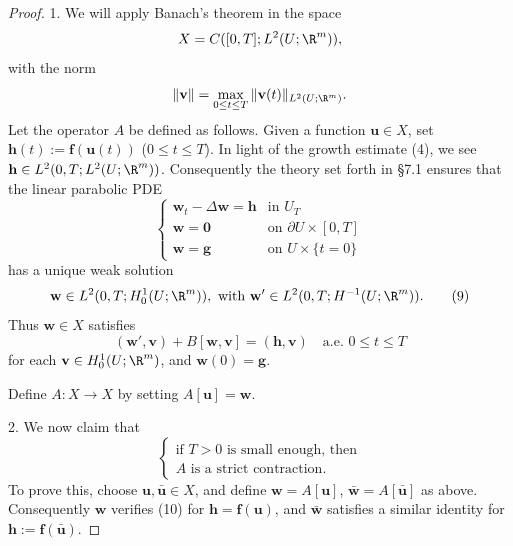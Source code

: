 \begin{proof}
1. We will apply Banach's theorem in the space
\[
X = C([0,T]; L^2(U;\R^m)),
\]
with the norm
\[
\|\mathbf{v}\| = \max_{0 \le t \le T} \|\mathbf{v}(t)\|_{L^2(U;\R^m)}.
\]
Let the operator $A$ be defined as follows. Given a function $\mathbf{u} \in X$, set $\mathbf{h}(t) := \mathbf{f}(\mathbf{u}(t))$ ($0 \le t \le T$). In light of the growth estimate (4), we see $\mathbf{h} \in L^2(0,T;L^2(U;\R^m))$. Consequently the theory set forth in \S7.1 ensures that the linear parabolic PDE
\[
\begin{cases}
\mathbf{w}_t - \Delta \mathbf{w} = \mathbf{h} & \text{in } U_T \\
\mathbf{w} = \mathbf{0} & \text{on } \partial U \times [0,T] \\
\mathbf{w} = \mathbf{g} & \text{on } U \times \{t=0\}
\end{cases}
\tag{8}
\]
has a unique weak solution
\[
\mathbf{w} \in L^2(0,T; H_0^1(U;\R^m)), \text{ with } \mathbf{w}' \in L^2(0,T; H^{-1}(U;\R^m)).
\tag{9}
\]
Thus $\mathbf{w} \in X$ satisfies
\[
(\mathbf{w}',\mathbf{v}) + B[\mathbf{w},\mathbf{v}] = (\mathbf{h},\mathbf{v}) \quad \text{a.e. } 0 \le t \le T
\tag{10}
\]
for each $\mathbf{v} \in H_0^1(U;\R^m)$, and $\mathbf{w}(0) = \mathbf{g}$.

Define $A : X \to X$ by setting $A[\mathbf{u}] = \mathbf{w}$.

2. We now claim that
\[
\begin{cases}
\text{if } T > 0 \text{ is small enough, then} \\
A \text{ is a strict contraction.}
\end{cases}
\tag{11}
\]
To prove this, choose $\mathbf{u}, \bar{\mathbf{u}} \in X$, and define $\mathbf{w} = A[\mathbf{u}]$, $\bar{\mathbf{w}} = A[\bar{\mathbf{u}}]$ as above. Consequently $\mathbf{w}$ verifies (10) for $\mathbf{h} = \mathbf{f}(\mathbf{u})$, and $\bar{\mathbf{w}}$ satisfies a similar identity for $\mathbf{h} := \mathbf{f}(\bar{\mathbf{u}})$.


\end{proof}
